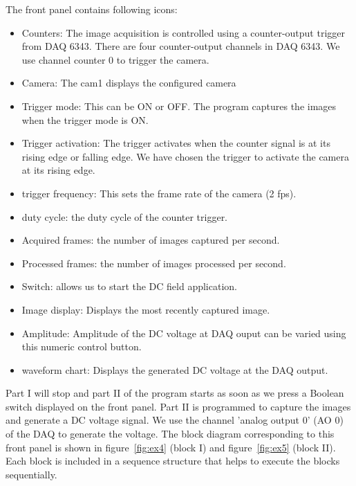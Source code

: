 \documentclass[journal=jacsat,manuscript=article]{achemso}
\begin{document}
The front panel contains following icons:
\begin{itemize}
  \item Counters: The image acquisition is controlled using a counter-output trigger
from DAQ 6343. There are four counter-output channels in DAQ 6343. We use channel counter 0 to trigger the camera.

 \item Camera: The cam1 displays the configured
   camera

   \item Trigger mode: This can be ON or OFF. The program captures the
     images when the trigger mode is ON.  
     \item Trigger activation: The trigger activates
       when the counter signal is at its rising edge or falling edge. We have
       chosen the trigger to activate the camera at its rising edge.
       
     \item trigger frequency: This sets the frame rate of the camera (2 fps).

 \item duty cycle:  the duty cycle of the
   counter trigger.
 \item Acquired frames: the number of images captured per second.
   \item Processed frames:  the number of images
     processed per second.
     \item Switch: allows us to start the DC field application.
     \item Image display: Displays the most recently captured image.
     \item Amplitude: Amplitude of the DC voltage at DAQ ouput can be varied using this numeric control button.
     \item waveform chart: Displays the generated DC voltage at the DAQ output.
\end{itemize}

Part I will stop and part II of the program starts as soon as we press a Boolean switch displayed on the front panel. Part II is programmed to capture the images and generate a DC voltage signal. We use the channel 'analog output 0' (AO 0) of the DAQ to generate the voltage. The block diagram corresponding to this front panel is shown in figure~\ref{fig:ex4} (block I) and figure~\ref{fig:ex5} (block II). 
Each block is included in a sequence structure that helps to execute the blocks sequentially.
 
\end{document}
